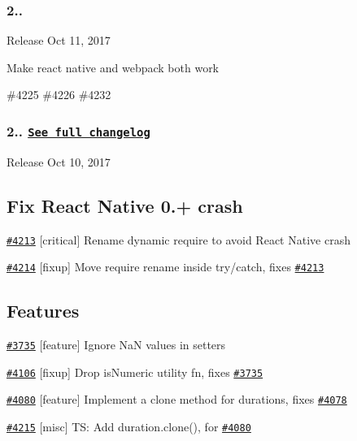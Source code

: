 \subsubsection*{2..}


\begin{DoxyItemize}
\item Release Oct 11, 2017
\end{DoxyItemize}

Make react native and webpack both work
\begin{DoxyItemize}
\item \#4225 \#4226 \#4232
\end{DoxyItemize}

\subsubsection*{2.. \href{https://gist.github.com/ichernev/5f3f4eb02761b4f765a0cccf02cec603}{\tt See full changelog}}


\begin{DoxyItemize}
\item Release Oct 10, 2017
\end{DoxyItemize}

\subsection*{Fix React Native 0.+ crash}


\begin{DoxyItemize}
\item \href{https://github.com/moment/moment/pull/4213}{\tt \#4213} \mbox{[}critical\mbox{]} Rename dynamic require to avoid React Native crash
\item \href{https://github.com/moment/moment/pull/4214}{\tt \#4214} \mbox{[}fixup\mbox{]} Move require rename inside try/catch, fixes \href{https://github.com/moment/moment/issues/4213}{\tt \#4213}
\end{DoxyItemize}

\subsection*{Features}


\begin{DoxyItemize}
\item \href{https://github.com/moment/moment/pull/3735}{\tt \#3735} \mbox{[}feature\mbox{]} Ignore NaN values in setters
\item \href{https://github.com/moment/moment/pull/4106}{\tt \#4106} \mbox{[}fixup\mbox{]} Drop is\+Numeric utility fn, fixes \href{https://github.com/moment/moment/issues/3735}{\tt \#3735}
\item \href{https://github.com/moment/moment/pull/4080}{\tt \#4080} \mbox{[}feature\mbox{]} Implement a clone method for durations, fixes \href{https://github.com/moment/moment/issues/4078}{\tt \#4078}
\item \href{https://github.com/moment/moment/pull/4215}{\tt \#4215} \mbox{[}misc\mbox{]} TS\+: Add duration.\+clone(), for \href{https://github.com/moment/moment/issues/4080}{\tt \#4080}
\end{DoxyItemize}

